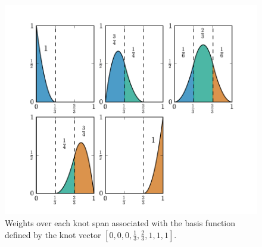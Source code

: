 \begin{figure}[htb]
    \centering
    \includegraphics[width=5in]{weights.pdf}
    \caption{\label{fig:weights}Weights over each knot span associated
        with the basis function defined by the knot vector
        $[0,0,0,\frac{1}{3},\frac{2}{3},1,1,1]$.}
\end{figure}
